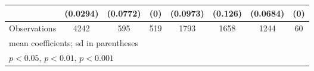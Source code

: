 {\begin{tabular}{l*{7}{c}}
                    &    (0.0294)         &    (0.0772)         &         (0)         &    (0.0973)         &     (0.126)         &    (0.0684)         &         (0)         \\
\hline
Observations        &        4242         &         595         &         519         &        1793         &        1658         &        1244         &          60         \\
\hline\hline
\multicolumn{8}{l}{\footnotesize mean coefficients; sd in parentheses}\\
\multicolumn{8}{l}{\footnotesize \sym{*} \(p<0.05\), \sym{**} \(p<0.01\), \sym{***} \(p<0.001\)}\\
\end{tabular}
}
